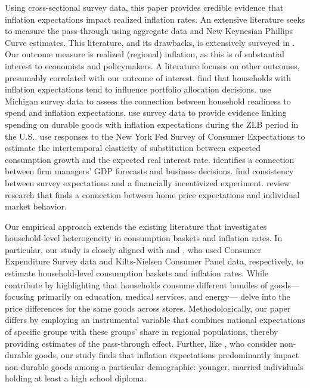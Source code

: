 \documentclass[12pt]{article}
\begin{document}
Using cross-sectional survey data, this paper provides credible evidence that inflation expectations impact realized inflation rates.  An extensive literature seeks to measure the pass-through using aggregate data and New Keynesian Phillips Curve estimates.  This literature, and its drawbacks, is extensively surveyed in \cite{Stocketal:JEL2014}.  Our outcome measure is realized (regional) inflation, as this is of substantial interest to economists and policymakers.  A literature focuses on other outcomes, presumably correlated with our outcome of interest.  \cite{Dacunto:groceryJPE} find that households with inflation expectations tend to influence portfolio allocation decisions. \cite{BachmannBergSims:AEJ2015} use Michigan survey data to assess the connection between household readiness to spend and inflation expectations. \cite{BurkeOzdagli:2022WP} use survey data to provide evidence linking spending on durable goods with inflation expectations during the ZLB period in the U.S.. \cite{CrumpEusepi:2021} use responses to the New York Fed Survey of Consumer Expectations to estimate the intertemporal elasticity of substitution between expected consumption growth and the expected real interest rate. \cite{TanakaBloom:JME2020} identifies a connection between firm managers' GDP forecasts and business decisions.  \cite{Armantieretal:IER2015} find consistency between survey expectations and a financially incentivized experiment. \cite{KuchlerPiazzesiStroebel:2022} review research that finds a connection between home price expectations and individual market behavior.  

Our empirical approach extends the existing literature that investigates household-level heterogeneity in consumption baskets and inflation rates. In particular, our study is closely aligned with \cite{HobijnLagakos:2005}  and \cite{KaplanWohl:JME2017}, who used Consumer Expenditure Survey data and Kilts-Nielsen Consumer Panel data, respectively, to estimate household-level consumption baskets and inflation rates. While \cite{HobijnLagakos:2005}  contribute by highlighting that households consume different bundles of goods—focusing primarily on education, medical services, and energy—\cite{KaplanWohl:JME2017} delve into the price differences for the same goods across stores. Methodologically, our paper differs by employing an instrumental variable that combines national expectations of specific groups with these groups' share in regional populations, thereby providing estimates of the pass-through effect. Further, like \cite{KaplanWohl:JME2017}, who consider non-durable goods, our study finds that inflation expectations predominantly impact non-durable goods among a particular demographic: younger, married individuals holding at least a high school diploma.
\end{document}
